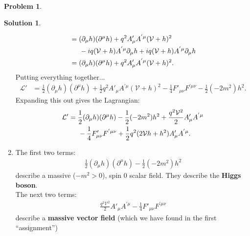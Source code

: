\documentclass[a4paper,11pt]{article}
\numberwithin{equation}{section}
\theoremstyle{definition}
\newtheorem{prob}{Problem}[section]
\newtheorem{sln}{Solution}[section]
\newcommand{\p}{\partial}
\newcommand{\lag}{\mathcal{L}}
\newcommand{\V}{\mathcal{V}}
\begin{document}
\begin{prob}
\begin{sln}
\begin{enumerate}
\begin{align}
				&= (\p_\mu h)(\p^\mu h) + q^2 A'_\mu A^{'\mu}(\V+h)^2\nonumber\\
				&\hspace{0.5cm} -iq(\V+h) A^{'\mu} \p_\mu h + iq(\V+h)A^{'\mu}\p_\mu h\nonumber\\
				&= (\p_\mu h)(\p^\mu h) + q^2 A'_\mu A^{'\mu}(\V+h)^2.
				\end{align}
				Putting everything together...
				\begin{align}
				\lag' &= \frac{1}{2}(\p_\mu h)(\p^\mu h) + \frac{1}{2}q^2 A'_\mu A^{'\mu}(\V+h)^2 - \frac{1}{4}F'_{\mu\nu}F^{'\mu\nu} - \frac{1}{2}(-2m^2)h^2.
				\end{align}
				Expanding this out gives the Lagrangian:
				\begin{align}
				\lag' &= \frac{1}{2}(\p_\mu h)(\p^\mu h) - \frac{1}{2}(-2m^2)h^2 + \frac{q^2\V^2}{2}A'_\mu A^{'\mu}\nonumber\\ 
				&\hspace{0.5cm} - \frac{1}{4}F'_{\mu\nu}F^{'\mu\nu} + \frac{1}{2}q^2(2\V h + h^2)A'_\mu A^{'\mu}.
				\end{align}
				
				
				
				
				
				
				
				
				
				
				
				
				
				
				
				
				
				
				
				
				
				
				
				
				
				
				\item The first two terms:
				\begin{align}
				\boxed{\frac{1}{2}(\p_\mu h)(\p^\mu h) - \frac{1}{2}(-2m^2)h^2}
				\end{align}
				describe a massive ($-m^2 > 0$), spin 0 scalar field. They describe the \textbf{Higgs boson}.\\
				
				The next two terms:
				\begin{align}
				\boxed{\frac{q^2\V^2}{2}A'_\mu A^{'\mu} - \frac{1}{4}F'_{\mu\nu}F^{'\mu\nu}}
				\end{align}
				describe a \textbf{massive vector field} (which we have found in the first ``assignment'')\\
				

\end{enumerate}
\end{sln}
\end{prob}
\end{document}
